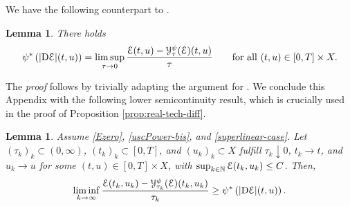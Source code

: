 \documentclass[a4paper,10pt,reqno]{amsart} %
\newcommand{\N}{\mathbb{N}}
\newtheorem{lemma}[theorem]{Lemma}
\numberwithin{equation}{section}
\newcommand{\down}{\downarrow}
\def\calY{{\mathcal Y}} \def\calZ{{\mathcal Z}}
\newcommand{\Xs}{X}
\newcommand{\mdn}{\mathsf{d}}
\newcommand{\md}[2]{\mathsf{d}(#1,#2)}
\newcommand{\RRR}{\color{red}}
\newcommand{\EEE}{\color{black}}
\begin{document}
We have the following counterpart to 
 \cite[Lemma 3.1.5]{AGS08}. 
\begin{lemma}
\label{l:AGS}
There holds
\begin{equation}
\label{ext-duality}
 \psi^* \left(|\mathrm{D} \calE|(t,u) \right) = \limsup_{\tau\to 0} \frac{\calE(t,u) - \calY_\tau^\psi(\calE)(t,u)} \tau \qquad \text{for all } (t,u) \in [0,T]\times\Xs. 
\end{equation}
\end{lemma}
The \emph{proof} follows by trivially adapting the argument for 
  \cite[Lemma 3.1.5]{AGS08}.
 We conclude this Appendix with   %
the following lower semicontinuity result, which is crucially used in the proof of Proposition \ref{prop:real-tech-diff}. 
\begin{lemma}
\label{l:AGS-2}
Assume \eqref{Ezero}, \eqref{uscPower-bis}, and \eqref{superlinear-case}. 
Let $(\tau_k)_k \subset (0,\infty)$,  $(t_k)_k \subset [0,T]$,  and $(u_k)_k  \subset \Xs$ fulfill   $\tau_k\down 0$, $t_k \to t$, and $u_k\to u$ for some 
$(t,u) \in [0,T]\times \Xs$,  with $\sup_{k\in \N}  \calE(t_k,u_k) \leq C$. Then,
\begin{equation}
\label{lsc-formula}
\liminf_{k\to\infty} \frac{\calE(t_k,u_k) - \calY_{\tau_k}^\psi(\calE)(t_k,u_k)} {\tau_k}\geq \psi^* \left(|\mathrm{D} \calE|(t,u) \right). 
\end{equation}
\end{lemma}
\end{document}
